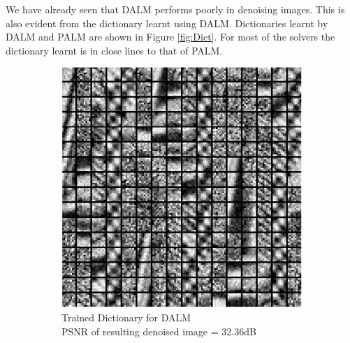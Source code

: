 \documentclass{article} %
\begin{document}
We have already seen that DALM performs poorly in denoising images. This is also evident from the dictionary learnt using DALM. Dictionaries learnt by DALM and PALM are shown in Figure \ref{fig:Dict}. For most of the solvers the dictionary learnt is in close lines to that of PALM.

\begin{figure}[H]
        \centering
        \begin{subfigure}[b]{0.5\textwidth}
                \includegraphics[width=\textwidth]{images/Trained_dict_DALM}
                \caption{Trained Dictionary for DALM\\PSNR of resulting denoised image = 32.36dB}
                \label{fig:DictDALM}
        \end{subfigure}%
        ~ %
        \begin{subfigure}[b]{0.5\textwidth}

\end{subfigure}
\end{figure}
\end{document}
